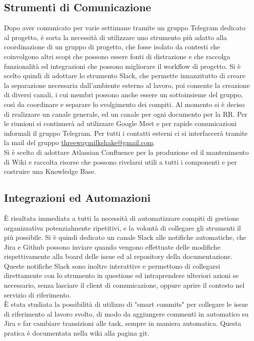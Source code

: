 \subsection{Strumenti di Comunicazione}
Dopo aver comunicato per varie settimane tramite un gruppo Telegram dedicato al progetto, è sorta la necessità di utilizzare uno strumento più adatto alla coordinazione di un gruppo di progetto, che fosse isolato da contesti che coinvolgono altri scopi che possono essere fonti di distrazione e che raccolga funzionalità ed integrazioni che possono migliorare il workflow di progetto. Si è scelto quindi di adottare lo strumento Slack, che permette innanzitutto di creare la separazione necessaria dall'ambiente esterno al lavoro, poi consente la creazione di diversi canali, i cui membri possono anche essere un sottoinsieme del gruppo, così da coordinare e separare lo svolgimento dei compiti. Al momento si è deciso di realizzare un canale generale, ed un canale per ogni documento per la RR. Per le riunioni si continuerà ad utilizzare Google Meet e per rapide comunicazioni informali il gruppo Telegram. Per tutti i contatti esterni ci si interfaccerà tramite la mail del gruppo \href{mailto:threewaymilkshake@gmail.com}{threewaymilkshake@gmail.com}.\\
Si è scelto di adottare Atlassian Confluence per la produzione ed il mantenimento di Wiki e raccolta risorse che possono rivelarsi utili a tutti i componenti e per costruire una Knowledge Base.

\subsection{Integrazioni ed Automazioni}
È risultata immediata a tutti la necessità di automatizzare compiti di gestione organizzativa potenzialmente ripetitivi, e la volontà di collegare gli strumenti il più possibile. Si è quindi dedicato un canale Slack alle notifiche automatiche, che Jira e Github possono inviare quando vengono effettuate delle modifiche rispettivamente alla board delle issue ed al repository della documentazione. Queste notifiche Slack sono inoltre interattive e permettono di collegarsi direttamente con lo strumento in questione ed intraprendere ulteriori azioni se necessario, senza lasciare il client di comunicazione, oppure aprire il contesto nel servizio di riferimento.\\
È stata studiata la possibilità di utilizzo di "smart commits" per collegare le issue di riferimento al lavoro svolto, di modo da aggiungere commenti in automatico su Jira e far cambiare transizioni alle task, sempre in maniera automatica. Questa pratica è documentata nella wiki alla pagina git.